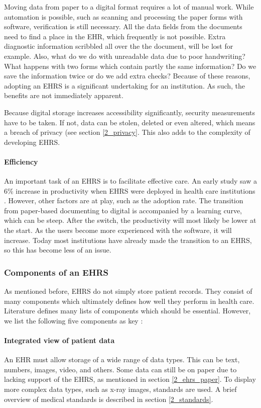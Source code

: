         Moving data from paper to a digital format requires a lot of manual work. While automation is possible, such as scanning and processing the paper forms with software, verification is still necessary. All the data fields from the documents need to find a place in the EHR, which frequently is not possible. Extra diagnostic information scribbled all over the the document, will be lost for example. Also, what do we do with unreadable data due to poor handwriting? What happens with two forms which contain partly the same information? Do we save the information twice or do we add extra checks? Because of these reasons, adopting an EHRS is a significant undertaking for an institution. As such, the benefits are not immediately apparent.

        Because digital storage increases accessibility significantly, security measurements have to be taken. If not, data can be stolen, deleted or even altered, which means a breach of privacy (see section \ref{2_privacy}. This also adds to the complexity of developing EHRS. 

        \paragraph{Efficiency} An important task of an EHRS is to facilitate effective care. An early study saw a 6\% increase in productivity when EHRS were deployed in health care institutions \cite{ehrs_efficiency}. However, other factors are at play, such as the adoption rate. The transition from paper-based documenting to digital is accompanied by a learning curve, which can be steep. After the switch, the productivity will most likely be lower at the start. As the users become more experienced with the software, it will increase. Today most institutions have already made the transition to an EHRS, so this has become less of an issue.

        \subsubsection{Components of an EHRS}

        As mentioned before, EHRS do not simply store patient records. They consist of many components which ultimately defines how well they perform in health care. Literature defines many lists of components which should be essential. However, we list the following five components as key \cite{biomedical_informatics}:

        \paragraph{Integrated view of patient data} An EHR must allow storage of a wide range of data types. This can be text, numbers, images, video, and others. Some data can still be on paper due to lacking support of the EHRS, as mentioned in section \ref{2_ehrs_paper}. To display more complex data types, such as x-ray images, standards are used. A brief overview of medical standards is described in section \ref{2_standards}.

